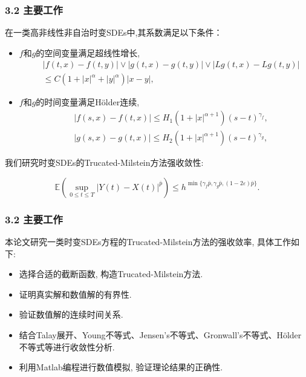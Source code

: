 \documentclass[notheorems,10pt,compress]{beamer}
\newcommand{\EE}{\mathbb{E}}
\numberwithin{figure}{section}
\numberwithin{table}{section}
\numberwithin{equation}{section}
\numberwithin{theorem}{section}
\numberwithin{definition}{section}
\numberwithin{lemma}{section}
\numberwithin{proposition}{section}
\numberwithin{corollary}{section}
\theoremstyle{example}
\def\a{\alpha}
\begin{document}
\begin{frame}		
    \frametitle{ 3.2 主要工作}
  \hspace{2em}在一类高非线性非自治时变SDEs中,其系数满足以下条件：
  \begin{itemize}
      \setlength{\itemsep}{0.1pt}
      \item  $f$和$g$的空间变量满足超线性增长,
       \begin{eqnarray*}
           &&|f(t,x)-f(t,y)|\vee |g(t,x)-g(t,y)|\vee |Lg(t,x)-Lg(t,y)|\\
           &&\leq C(1+|x|^{\a}+|y|^{\a})|x-y|,
       \end{eqnarray*}   
    \item $f$和$g$的时间变量满足H{\"o}lder连续,
    \begin{eqnarray*}
        &&|f(s,x)-f(t,x)|\leq H_1(1+|x|^{\a+1})(s-t)^{\gamma_{f}},\\
        &&|g(s,x)-g(t,x)|\leq H_2(1+|x|^{\a+1})(s-t)^{\gamma_{g}},
    \end{eqnarray*}
\end{itemize}
\hspace{2em}我们研究时变SDEs的Trucated-Milstein方法强收敛性:
 \begin{block}{}
    \begin{equation*}
           \EE\left( \sup_{0\leq t\leq T}|Y(t)-X(t)|^{\bar{p}}\right)\leq h^{\min\{\gamma_f\bar{p},\gamma_g\bar{p},(1-2\varepsilon)\bar{p}\}}.
    \end{equation*}
\end{block}
\end{frame}
		
            \begin{frame}		
                \frametitle{ 3.2 主要工作}
        \setlength{\parindent}{2em}本论文研究一类时变SDEs方程的Trucated-Milstein方法的强收敛率, 具体工作如下:
        \vskip 5pt
        \begin{itemize}
            \setlength{\itemsep}{5pt}
            \item 选择合适的截断函数, 构造Trucated-Milstein方法.
            \item 证明真实解和数值解的有界性.
            \item 验证数值解的连续时间关系.
            \item 结合Talay展开、Young不等式、Jensen’s不等式、Gronwall’s不等式、H{\"o}lder不等式等进行收敛性分析.
            \item 利用Matlab编程进行数值模拟, 验证理论结果的正确性.
        \end{itemize}
    \end{frame}
		
\end{document}
